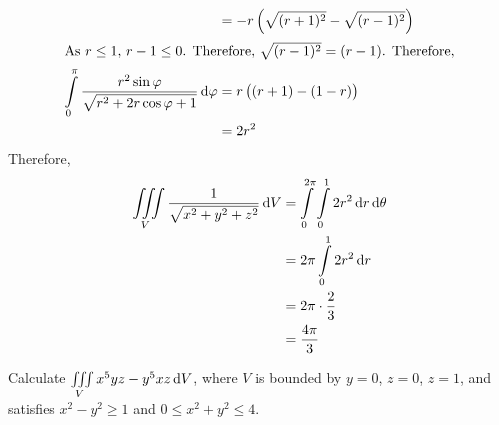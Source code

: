 \documentclass[fleqn, a4paper, 12pt, twoside]{article}
\theoremstyle{definition}
\theoremstyle{theorem}
\begin{document}
\begin{solution}
\begin{align*}
                                                                                                              & = -r \left( \sqrt{(r + 1)^2} - \sqrt{(r - 1)^2} \right)                              \\
		\intertext{As $r \le 1$, $r - 1 \le 0$. Therefore, $\sqrt{(r - 1)^2} = (r - 1)$. Therefore,}
		\int\limits_{0}^{\pi} \frac{r^2 \sin \varphi}{\sqrt{r^2 + 2 r \cos \varphi + 1}} \dif \varphi & = r \left( (r + 1) - (1 - r) \right)                                                \\
                                                                                                              & = 2 r^2
	\end{align*}
	Therefore,
	\begin{align*}
		\iiint\limits_{V} \frac{1}{\sqrt{x^2 + y^2 + z^2}} \dif V & = \int\limits_{0}^{2 \pi} \int\limits_{0}^{1} 2 r^2 \dif r \dif \theta \\
                                                                          & = 2 \pi \int\limits_{0}^{1} 2 r^2 \dif r                               \\
                                                                          & = 2 \pi \cdot \frac{2}{3}                                              \\
                                                                          & = \frac{4 \pi}{3}
	\end{align*}
\end{solution}

\begin{question}
	Calculate $\iiint\limits_{V} x^5 y z - y^5 x z \dif V$, where $V$ is bounded by $y = 0$, $z = 0$, $z = 1$, and satisfies $x^2 - y^2 \ge 1$ and $0 \le x^2 + y^2 \le 4$.
\end{question}
\end{document}
